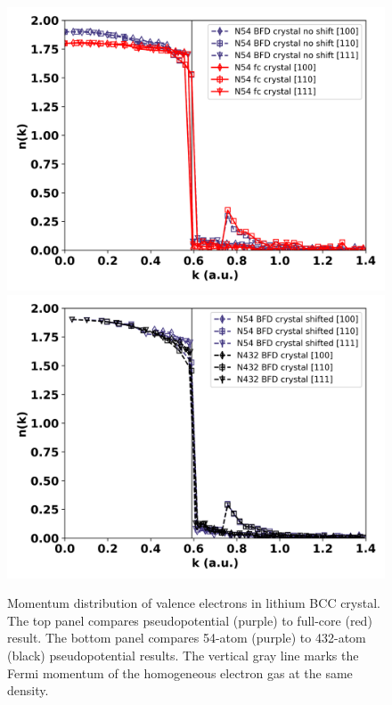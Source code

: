 \documentclass[aps,prb,showpacs,preprintnumbers,amsmath,amssymb,superscriptaddress,twocolumn]{revtex4}
\begin{document}
\begin{figure}
\includegraphics[scale=0.45]{figures/li40_bfd3-n54-nk-ppc}
\includegraphics[scale=0.45]{figures/li40_bfd3-nk-fsc}
\caption{Momentum distribution of valence electrons in lithium BCC crystal. The top panel compares pseudopotential (purple) to full-core (red) result.
The bottom panel compares 54-atom (purple) to 432-atom (black) pseudopotential results. The vertical gray line marks the Fermi momentum of the homogeneous electron gas at the same density.\label{fig:nk}}
\end{figure}
\end{document}
